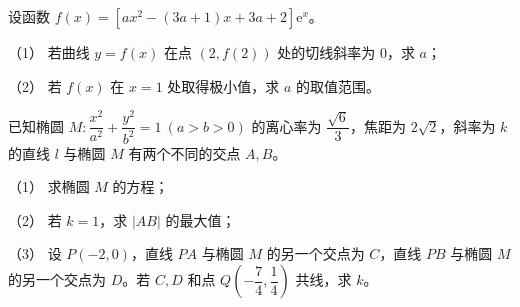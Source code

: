 \begin{question}
设函数 $f(x)=[ax^2-(3a+1)x+3a+2]\mathrm e^x$。

（1） 若曲线 $y=f(x)$ 在点 $(2,f(2))$ 处的切线斜率为 $0$，求 $a$；

（2） 若 $f(x)$ 在 $x=1$ 处取得极小值，求 $a$ 的取值范围。

\end{question}
\begin{question}
已知椭圆 $M:\dfrac{x^2}{a^2}+\dfrac{y^2}{b^2}=1\ (a>b>0)$ 的离心率为 $\dfrac{\sqrt6}{3}$，焦距为 $2\sqrt2$，斜率为 $k$ 的直线 $l$ 与椭圆 $M$ 有两个不同的交点 $A,B$。

（1） 求椭圆 $M$ 的方程；

（2） 若 $k=1$，求 $|AB|$ 的最大值；

（3） 设 $P(-2,0)$，直线 $PA$ 与椭圆 $M$ 的另一个交点为 $C$，直线 $PB$ 与椭圆 $M$ 的另一个交点为 $D$。若 $C,D$ 和点 $Q\left(-\dfrac74,\dfrac14\right)$ 共线，求 $k$。

\end{question}